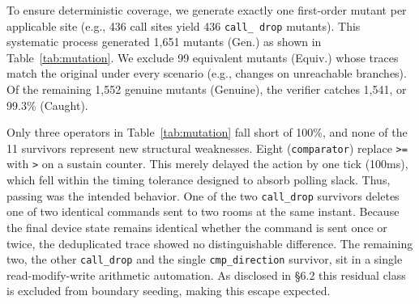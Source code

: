 \documentclass[sigconf,nonacm,anonymous,review]{acmart}
\begin{document}
To ensure deterministic coverage, we generate exactly one first-order mutant per applicable site (e.g., 436 call sites yield 436 \texttt{call\_ drop} mutants). This systematic process generated 1,651 mutants (Gen.) as shown in Table~\ref{tab:mutation}. We exclude 99 equivalent mutants (Equiv.) whose traces match the original under every scenario (e.g., changes on unreachable branches). Of the remaining 1,552 genuine mutants (Genuine), the verifier catches 1,541, or 99.3\% (Caught). 

Only three operators in Table~\ref{tab:mutation} fall short of 100\%, and none of the 11 survivors represent new structural weaknesses. Eight (\texttt{comparator}) replace \texttt{>=} with \texttt{>} on a sustain counter. This merely delayed the action by one tick (100ms), which fell within the timing tolerance designed to absorb polling slack. Thus, passing was the intended behavior. %
One of the two \texttt{call\_drop} survivors deletes one of two identical commands sent to two rooms at the same instant. Because the final device state remains identical whether the command is sent once or twice, the deduplicated trace showed no distinguishable difference. %
The remaining two, the other \texttt{call\_drop} and the single \texttt{cmp\_direction} survivor, sit in a single read-modify-write arithmetic automation. As disclosed in \S6.2 this residual class is excluded from boundary seeding, making this escape expected. %
\end{document}
